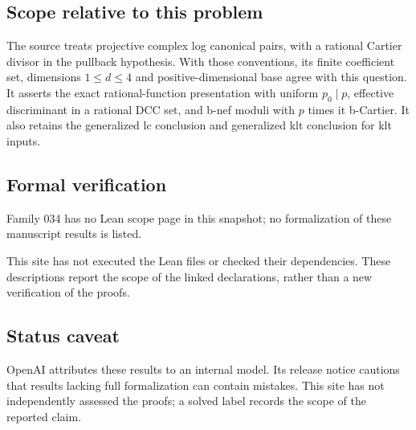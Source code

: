 \documentclass[11pt]{article}
\begin{document}
\subsection{Scope relative to this problem}
The source treats projective complex log canonical pairs, with a rational Cartier divisor in the pullback hypothesis. With those conventions, its finite coefficient set, dimensions $1\le d\le4$ and positive-dimensional base agree with this question. It asserts the exact rational-function presentation with uniform $p_0\mid p$, effective discriminant in a rational DCC set, and b-nef moduli with $p$ times it b-Cartier. It also retains the generalized lc conclusion and generalized klt conclusion for klt inputs.

\subsection{Formal verification}
Family 034 has no Lean scope page in this snapshot; no formalization of these manuscript results is listed.

This site has not executed the Lean files or checked their dependencies. These descriptions report the scope of the linked declarations, rather than a new verification of the proofs.

\subsection{Status caveat}
OpenAI attributes these results to an internal model. Its release notice cautions that results lacking full formalization can contain mistakes. This site has not independently assessed the proofs; a solved label records the scope of the reported claim.
\end{document}
